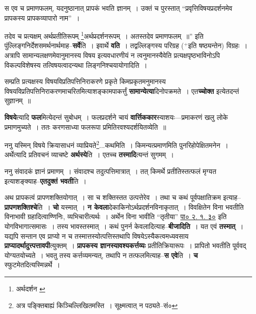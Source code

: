 \documentclass[article,12pt,a4paper]{memoir}
\newcommand{\add}[1]{($^{+}$#1)}
\begin{document}
	स एव च प्रमाणफलम्, यदनुष्ठानात् प्रापकं भवति ज्ञानम् । उक्तं च पुरस्तात् “प्रवृत्तिविषयप्रदर्शनमेव प्रापकस्य प्रापकव्यापारो नाम” । 
	  
	तदेव च प्रत्यक्षम् अर्थप्रतीतिरूपम् \footnote{अर्थदर्शन \cite{dp-msA} \cite{dp-edP} \cite{dp-edH} \cite{dp-edE} \cite{dp-edN}}अर्थप्रदर्शनरूपम् । अतस्तदेव प्रमाणफलम् ॥” इति पुंल्लिङ्गनिर्देशसमर्थनार्थमाह--\textbf{सर्वे}ति । इवार्थे \textbf{वति} । तद्वल्लिङ्गस्य परिग्रह \add{इति षष्ठ्यन्तेन} विग्रहः । अत्रापि सामान्यलक्षणमेवानुमानस्य विषय इत्यवधारणीयं न त्वनुमानस्यैवेति प्रत्यक्षपृष्ठभाविनोऽपि विकल्पविशेषस्य तत्विषयत्वादन्यथा लिङ्गनिश्चयायोगादिति ।
	\pend
      

	  \pstart सम्प्रति प्रत्यक्षस्य विषयविप्रतिपत्तिनिराकरणे प्रकृते किमप्रकृतमनुमानस्य विषयविप्रतिपत्तिनिराकरणमाचरितमित्याशङ्कामपाकर्त्तुं \textbf{सामान्येत्या}दिनोपक्रमते । एत\textbf{च्चोक्त} इत्येतदन्तं सुज्ञानम् ॥
	\pend
      

	  \pstart \textbf{विषये}त्यादि \textbf{फल}मित्येदन्तं सुबोधम् । फलप्रदर्शने चायं \textbf{वार्त्तिककार}स्याशयः—प्रमाकरणं खलु लोके प्रमाणमुच्यते । ततः करणसाध्या फलरूपा प्रमितिरवश्यदर्शयितव्येति ॥
	\pend
      

	  \pstart ननु यस्मिन् विषये क्रियासाधनं व्याप्रियते\footnote{अत्र पङ्क्तिबाह्यं किञ्चिल्लिखितमस्ति । सूक्ष्मत्वात् न पठ्यते--सं०}...कथमिति । किमन्यत्प्रमाणमिति पुनरिहोपेक्षितमनेन । अर्थेत्यादि प्रतिवचनं व्याचष्टे \textbf{अर्थस्ये}ति । एतच्च \textbf{तस्मादि}त्यन्तं सुगमम् ।
	\pend
      

	  \pstart ननु संवादकं ज्ञानं प्रमाणम् । संवादश्च तदुत्पत्तिमात्रात् । तत् किमर्थे प्रतीतिस्तत्फलं मृग्यत इत्याशङ्क्याह--\textbf{एतदुक्तं भवती}ति ।
	\pend
      \leavevmode{}

	  \pstart अथ प्रापकत्वं प्रापणशक्तियोगात् । सा च शक्तिस्तत उत्पत्तेरेव । तथा च कथं पूर्वपक्षातिक्रम इत्याह--\textbf{प्रापणशक्तिश्चे}ति । \textbf{चो} यस्मात् । \textbf{न केवला}देकाकिनोऽर्थप्रदर्शनविनाकृतात् । विवक्षितेन विना भवतीति विनाभावी ग्रहादित्वाण्णिनिः, व्यभिचारीत्यर्थः । अर्थेन विना भावीति “तृतीया” \href{http://http://sarit.indology.info/?cref=Pā.2.1.30}{पा० २. १. ३०} इति योगविभागात्समासः । तस्य भावस्तस्मात् । कथं पुनर्न केवलादित्याह--\textbf{बीजादिति} । यत एवं \textbf{तस्मात्} । यद्यपि सन्तान एव प्राप्यो न च तस्मात्तस्योत्पत्तिस्तथापि विषयेऽस्यैकत्वमध्यवसाय \textbf{प्राप्यादर्थादुत्त्पत्तावपी}त्युक्तम् । \textbf{प्रापकस्य ज्ञानस्यावश्यकर्त्तव्यः} प्रतीतिक्रियारूपः । प्रापितो भवतीति पूर्ववद् योग्यत\leavevmode{}योच्यते । भवतु तस्य कर्त्तव्यमन्यत्, तथापि न तत्फलमित्याह--\textbf{स एवे}ति । \textbf{च} स्फुटमेतदित्यस्मिन्नर्थे ।
	\pend
      
\end{document}
